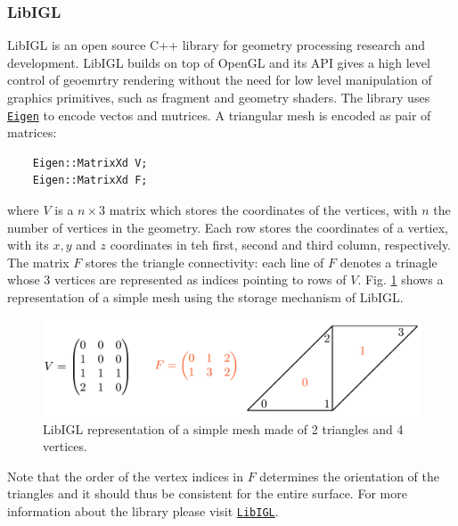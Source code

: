 \subsubsection{LibIGL}
LibIGL is an open source C++ library for geometry processing research
and development. LibIGL builds on top of OpenGL and its
API gives a high level control of geoemrtry rendering 
without the need for low level manipulation of graphics primitives, such as 
fragment and geometry shaders. The library uses 
\texttt{\href{https://eigen.tuxfamily.org/index.php?title=Main_Page}{Eigen}}
to encode vectos and mutrices. A triangular mesh is encoded as pair of 
matrices:
\begin{verbatim}
    Eigen::MatrixXd V; 
    Eigen::MatrixXd F;
\end{verbatim}
where $V$ is a $n \times 3$ matrix which stores the coordinates of the vertices,
with $n$ the number of vertices in the geometry. Each row stores the 
coordinates of a vertiex, with its $x, y$ and $z$ coordinates in teh first, 
second and third column, respectively. The matrix $F$ stores the triangle 
connectivity: each line of $F$ denotes a trinagle whose 3 vertices are 
represented as indices pointing to rows of $V$. Fig. \ref{fig:simple_mesh}
shows a representation of a simple mesh using the storage mechanism of 
LibIGL.
\begin{figure}
    \centering\includegraphics[width=1.0 \linewidth]{Figures/libigl_vf.png}
    \caption{LibIGL representation of a simple mesh made of 2 triangles and 4
    vertices.}
    \label{fig:simple_mesh}
\end{figure}
Note that the order of the vertex indices in $F$ determines the orientation
of the triangles and it should thus be consistent for the entire surface. 
For more information about the library please visit
\texttt{\href{https://libigl.github.io/tutorial/}{LibIGL}}.

